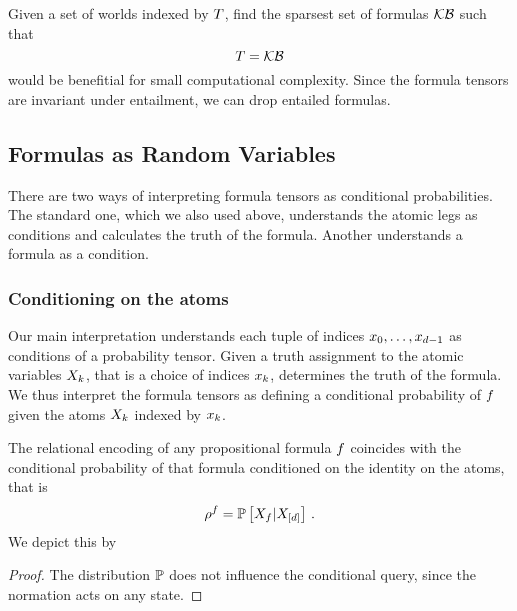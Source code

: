\begin{remark}
	Given a set of worlds indexed by $T$, find the sparsest set of formulas $\mathcal{KB}$ such that
		\[ T = {\mathcal{KB}} \]
	would be benefitial for small computational complexity.
	Since the formula tensors are invariant under entailment, we can drop entailed formulas.
\end{remark}	





\subsection{Formulas as Random Variables}



There are two ways of interpreting formula tensors as conditional probabilities.
The standard one, which we also used above, understands the atomic legs as conditions and calculates the truth of the formula.
Another understands a formula as a condition.

\subsubsection{Conditioning on the atoms}

Our main interpretation understands each tuple of indices ${x_{0},\ldots,x_{d-1}}$ as conditions of a probability tensor.
Given a truth assignment to the atomic variables $X_{k}$, that is a choice of indices $x_{k}$, determines the truth of the formula.
We thus interpret the formula tensors as defining a conditional probability of $f$ given the atoms $X_{k}$ indexed by $x_{k}$.

\begin{theorem}\label{the:conditionByAtoms}
	The relational encoding of any propositional formula $f$ coincides with the conditional probability of that formula conditioned on the identity on the atoms, that is
		\[ \rho^{f} = \mathbb{P}\left[X_{f}|X_{[d]}\right] \, . \]
	We depict this by
	\begin{center}
		
	\end{center}
\end{theorem}
\begin{proof}
	The distribution $\mathbb{P}$ does not influence the conditional query, since the normation acts on any state.
\end{proof}


